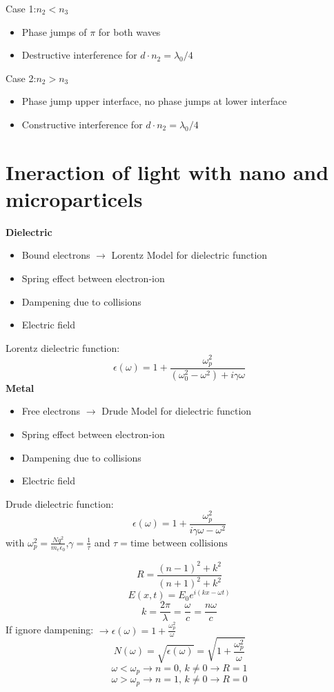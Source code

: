 Case 1:\(n_2 < n_3\)
\begin{itemize}
    \item Phase jumps of \(\pi\) for both waves
    \item Destructive interference for \(d \cdot n_2 = \lambda_0/4\)
\end{itemize}
Case 2:\(n_2 > n_3\)
\begin{itemize}
    \item Phase jump upper interface, no phase jumps at lower interface
    \item Constructive interference for \(d\cdot n_2 = \lambda_0/4\)
\end{itemize}

\section{Ineraction of light with nano and microparticels}
\textbf{Dielectric}
\begin{itemize}
    \item Bound electrons \(\rightarrow\) Lorentz Model for dielectric function
    \item Spring effect between electron-ion
    \item Dampening due to collisions
    \item Electric field
\end{itemize}

Lorentz dielectric function:
\[
\epsilon(\omega) = 1 + \frac{\omega^2_p}{(\omega_0^2-\omega^2)+i\gamma \omega}
\]
\textbf{Metal}
\begin{itemize}
    \item Free electrons \(\rightarrow\) Drude Model for dielectric function
    \item Spring effect between electron-ion
    \item Dampening due to collisions
    \item Electric field
\end{itemize}

Drude dielectric function:
\[
\epsilon(\omega) = 1 + \frac{\omega^2_p}{i\gamma \omega-\omega^2}
\]
with \(\omega^2_p = \frac{Nq^2}{m_e\epsilon_0}\),\(\gamma = \frac{1}{\tau}\) and \(\tau = \text{time between collisions}\)

\[
R = \frac{\left(n-1\right)^2 + k^2}{\left(n+1\right)^2 + k^2}
\]
\[
E(x,t) = E_0 e^{i\left(kx - \omega t\right)}
\]
\[
k = \frac{2\pi}{\lambda} = \frac{\omega}{c} = \frac{n\omega}{c}
\]
If ignore dampening: \(\rightarrow \epsilon(\omega) = 1 + \frac{\omega^2_p}{\omega}\)
\[
N(\omega) = \sqrt{\epsilon(\omega)} = \sqrt{1 + \frac{\omega^2_p}{\omega}}
\]
\[
\omega < \omega_p \rightarrow n=0,\,k\neq0 \rightarrow R = 1
\]
\[
\omega > \omega_p \rightarrow n=1,\,k\neq0 \rightarrow R = 0
\]

